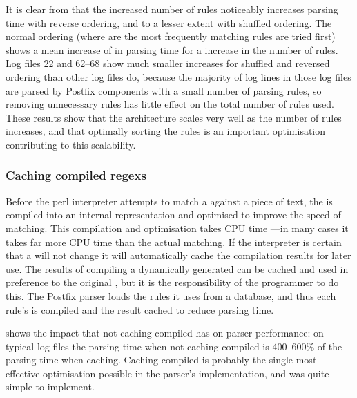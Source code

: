 
It is clear from  that the increased number of rules noticeably
increases parsing time with reverse ordering, and to a lesser extent with
shuffled ordering.  The normal ordering (where are the most frequently
matching rules are tried first) shows a mean increase of
 in parsing time
for a \numberOFrulesMAXIMUMpercentage{} increase in the number of rules.
Log files 22 and 62--68 show much smaller increases for shuffled and
reversed ordering than other log files do, because the majority of log
lines in those log files are parsed by Postfix components with a small
number of parsing rules, so removing unnecessary rules has little effect on
the total number of rules used.  These results show that the architecture
scales very well as the number of rules increases, and that optimally
sorting the rules is an important optimisation contributing to this
scalability.

\subsubsection{Caching compiled regexs}

\label{Caching compiled regexes}

Before the perl interpreter attempts to match a \regex{} against a piece of
text, the \regex{} is compiled into an internal representation and
optimised to improve the speed of matching.  This compilation and
optimisation takes CPU time ---in many cases it takes far more CPU time
than the actual matching.  If the interpreter is certain that a \regex{}
will not change it will automatically cache the compilation results for
later use.   The results of compiling a dynamically generated \regex{} can
be cached and used in preference to the original \regex{}, but it is the
responsibility of the programmer to do this.  The Postfix parser loads the
rules it uses from a database, and thus each rule's \regex{} is compiled
and the result cached to reduce parsing time.

shows the impact that not caching compiled \regexes{} has on parser
performance: on typical log files the parsing time when not caching
compiled \regexes{} is 400--600\% of the parsing time when caching.
Caching compiled \regexes{} is probably the single most effective
optimisation possible in the parser's implementation, and was quite simple
to implement.

